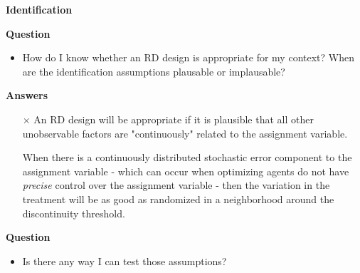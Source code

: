\begin{frame}\begin{center}
		\LARGE\textbf{Identification}
\end{center}\end{frame}
\begin{frame}\textbf{Question}\vspace{0.3cm}

\begin{itemize}\setlength\itemsep{1em}
\item How do I know whether an RD design is appropriate for my context? When are the identification assumptions plausable or implausable?
\end{itemize}

\end{frame}
\begin{frame}\textbf{Answers}\vspace{0.3cm}

\begin{itemize}\setlength\itemsep{1em}
\item[$\times$] An RD design will be appropriate if it is plausible that all other unobservable factors are "continuously"  related to the assignment variable.

\item[\checkmark]  When there is a continuously distributed stochastic error component to the assignment variable - which can occur when optimizing agents do not have \textit{precise} control over the assignment variable - then the variation in the treatment will be as good as randomized in a neighborhood around the discontinuity threshold.
\end{itemize}

\end{frame}
\begin{frame}\textbf{Question}\vspace{0.3cm}

\begin{itemize}\setlength\itemsep{1em}
\item Is there any way I can test those assumptions?
\end{itemize}

\end{frame}
